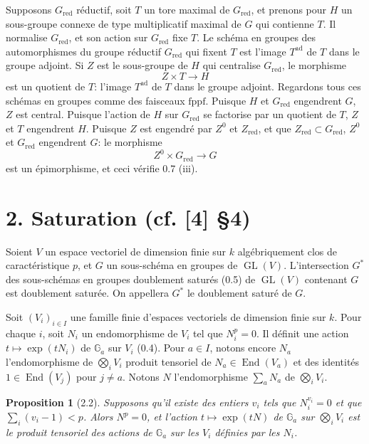 \documentclass[10pt]{article}
\newcommand{\Ga}{\mathbb G_a}
\newcommand{\GL}{\operatorname{GL}}
\newcommand{\red}{\mathrm{red}}
\newcommand{\End}{\operatorname{End}}
\newcommand{\fppf}{\mathrm{fppf}}
\theoremstyle{deligne}
\newtheorem*{proposition*}{Proposition}
\newcommand{\heading}[1]{\vspace{0.7em}\noindent{\bfseries #1}\quad}
\begin{document}
\heading{1.25. Preuve de 0.7 (iii).}
Supposons \(G_{\red}\) réductif, soit \(T\) un tore maximal de \(G_{\red}\), et prenons pour \(H\) un sous-groupe connexe de type multiplicatif maximal de \(G\) qui contienne \(T\). Il normalise \(G_{\red}\), et son action sur \(G_{\red}\) fixe \(T\). Le schéma en groupes des automorphismes du groupe réductif \(G_{\red}\) qui fixent \(T\) est l'image \(T^{\mathrm{ad}}\) de \(T\) dans le groupe adjoint. Si \(Z\) est le sous-groupe de \(H\) qui centralise \(G_{\red}\), le morphisme
\[
Z\times T\longrightarrow H
\]
est un quotient de \(T\): l'image \(T^{\mathrm{ad}}\) de \(T\) dans le groupe adjoint. Regardons tous ces schémas en groupes comme des faisceaux \(\fppf\). Puisque \(H\) et \(G_{\red}\) engendrent \(G\), \(Z\) est central. Puisque l'action de \(H\) sur \(G_{\red}\) se factorise par un quotient de \(T\), \(Z\) et \(T\) engendrent \(H\). Puisque \(Z\) est engendré par \(Z^0\) et \(Z_{\red}\), et que \(Z_{\red}\subset G_{\red}\), \(Z^0\) et \(G_{\red}\) engendrent \(G\): le morphisme
\[
Z^0\times G_{\red}\longrightarrow G
\]
est un épimorphisme, et ceci vérifie 0.7 (iii).

\section*{2. Saturation (cf. [4] \S4)}

\heading{2.1.}
Soient \(V\) un espace vectoriel de dimension finie sur \(k\) algébriquement clos de caractéristique \(p\), et \(G\) un sous-schéma en groupes de \(\GL(V)\). L'intersection \(G^*\) des sous-schémas en groupes doublement saturés (0.5) de \(\GL(V)\) contenant \(G\) est doublement saturée. On appellera \(G^*\) le doublement saturé de \(G\).

Soit \((V_i)_{i\in I}\) une famille finie d'espaces vectoriels de dimension finie sur \(k\). Pour chaque \(i\), soit \(N_i\) un endomorphisme de \(V_i\) tel que \(N_i^p=0\). Il définit une action \(t\mapsto \exp(tN_i)\) de \(\Ga\) sur \(V_i\) (0.4). Pour \(a\in I\), notons encore \(N_a\) l'endomorphisme de \(\bigotimes_i V_i\) produit tensoriel de \(N_a\in\End(V_a)\) et des identités \(1\in\End(V_j)\) pour \(j\ne a\). Notons \(N\) l'endomorphisme \(\sum_a N_a\) de \(\bigotimes_i V_i\).

\begin{proposition*}[2.2]
Supposons qu'il existe des entiers \(v_i\) tels que \(N_i^{v_i}=0\) et que \(\sum_i(v_i-1)<p\). Alors \(N^p=0\), et l'action \(t\mapsto\exp(tN)\) de \(\Ga\) sur \(\bigotimes_i V_i\) est le produit tensoriel des actions de \(\Ga\) sur les \(V_i\) définies par les \(N_i\).
\end{proposition*}
\end{document}
